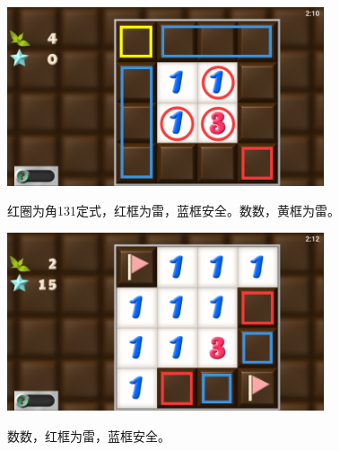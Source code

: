 \subsection{} %
\begin{center}
    \includegraphics[width=0.7\textwidth]{puzzle/26-1.png}
\end{center}
红圈为角131定式，红框为雷，蓝框安全。数数，黄框为雷。
\begin{center}
    \includegraphics[width=0.7\textwidth]{puzzle/26-2.png}
\end{center}
数数，红框为雷，蓝框安全。

